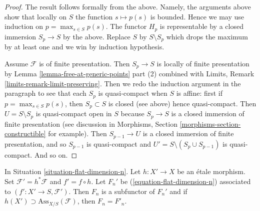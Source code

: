\begin{proof}
\medskip\noindent
The result follows formally from the above.
Namely, the arguments above show that locally on $S$ the function
$s \mapsto p(s)$ is bounded. Hence we may use induction
on $p = \max_{s \in S} p(s)$. The functor $H_p$ is representable
by a closed immersion $S_p \to S$ by the above. Replace $S$ by
$S \setminus S_p$ which drops the maximum by at least one and
we win by induction hypothesis.

\medskip\noindent
Assume $\mathcal{F}$ is of finite presentation.
Then $S_p \to S$ is locally of finite presentation by
Lemma \ref{lemma-free-at-generic-points} part (2) combined with
Limits, Remark \ref{limits-remark-limit-preserving}.
Then we redo the induction argument in the paragraph to
see that each $S_p$ is quasi-compact when $S$ is affine:
first if $p = \max_{s \in S} p(s)$, then $S_p \subset S$
is closed (see above) hence quasi-compact. Then $U = S \setminus S_p$
is quasi-compact open in $S$ because $S_p \to S$ is a closed
immersion of finite presentation (see discussion in Morphisms, Section
\ref{morphisms-section-constructible} for example). Then $S_{p - 1} \to U$
is a closed immersion of finite presentation, and so $S_{p - 1}$
is quasi-compact and $U' = S \setminus (S_p \cup S_{p - 1})$
is quasi-compact. And so on.
\end{proof}

\begin{lemma}
\label{lemma-localize-flat-dimension-n}
In Situation \ref{situation-flat-dimension-n}.
Let $h : X' \to X$ be an \'etale morphism.
Set $\mathcal{F}' = h^*\mathcal{F}$ and $f' = f \circ h$.
Let $F_n'$ be (\ref{equation-flat-dimension-n})
associated to $(f' : X' \to S, \mathcal{F}')$.
Then $F_n$ is a subfunctor of $F_n'$ and if
$h(X') \supset \text{Ass}_{X/S}(\mathcal{F})$, then $F_n = F'_n$.
\end{lemma}

